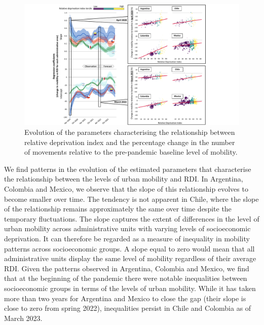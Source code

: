 \documentclass[
  11pt,
]{article}
\begin{document}
\begin{figure}

{\centering \includegraphics{figures/regression-evo-nobackground.pdf}

}

\caption{Evolution of the parameters characterising the relationship
between relative deprivation index and the percentage change in the
number of movements relative to the pre-pandemic baseline level of
mobility.}

\end{figure}

We find patterns in the evolution of the estimated parameters that
characterise the relationship between the levels of urban mobility and
RDI. In Argentina, Colombia and Mexico, we observe that the slope of
this relationship evolves to become smaller over time. The tendency is
not apparent in Chile, where the slope of the relationship remains
approximately the same over time despite the temporary fluctuations. The
slope captures the extent of differences in the level of urban mobility
across administrative units with varying levels of socioeconomic
deprivation. It can therefore be regarded as a measure of inequality in
mobility patterns across socioeconomic groups. A slope equal to zero
would mean that all administrative units display the same level of
mobility regardless of their average RDI. Given the patterns observed in
Argentina, Colombia and Mexico, we find that at the beginning of the
pandemic there were notable inequalities between socioeconomic groups in
terms of the levels of urban mobility. While it has taken more than two
years for Argentina and Mexico to close the gap (their slope is close to
zero from spring 2022), inequalities persist in Chile and Colombia as of
March 2023.
\end{document}

